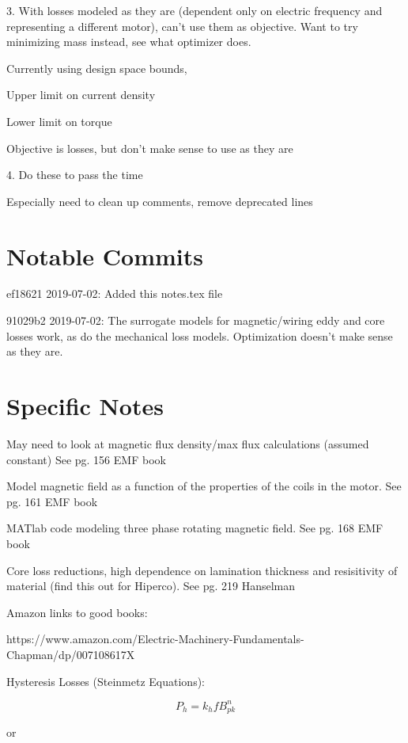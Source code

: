 \documentclass[10pt]{article}
\begin{document}
3.
With losses modeled as they are (dependent only on electric frequency and representing a different motor), can't use them as objective.
Want to try minimizing mass instead, see what optimizer does.

Currently using design space bounds,

Upper limit on current density 

Lower limit on torque 

Objective is losses, but don't make sense to use as they are

4. 
Do these to pass the time

Especially need to clean up comments, remove deprecated lines




\section{Notable Commits}

ef18621 2019-07-02: Added this notes.tex file

91029b2 2019-07-02: The surrogate models for magnetic/wiring eddy and core losses work, as do the mechanical loss models. Optimization doesn't make sense as they are.

\section{Specific Notes}

May need to look at magnetic flux density/max flux calculations (assumed constant) See pg. 156 EMF book

Model magnetic field as a function of the properties of the coils in the motor. See pg. 161 EMF book

MATlab code modeling three phase rotating magnetic field. See pg. 168 EMF book

Core loss reductions, high dependence on lamination thickness and resisitivity of material (find this out for Hiperco). See pg. 219 Hanselman

Amazon links to good books:

https://www.amazon.com/Electric-Machinery-Fundamentals-Chapman/dp/007108617X

Hysteresis Losses (Steinmetz Equations):

\begin{equation}
P_h = k_hfB_{pk}^n
\end{equation}

or 
\end{document}
